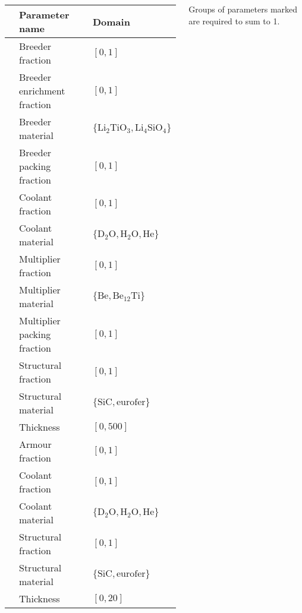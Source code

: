\begin{frame}
\begin{columns}[T]
		\vspace{5pt}
		{\fontsize{7.5pt}{7.5pt}\selectfont
		\setlength\tabcolsep{3pt}
		\begin{tabular}{l|ll}
		\toprule
		{} & Parameter name & Domain\\
		\midrule
		\parbox[t]{2mm}{\hspace{-2pt}}
		   & Breeder fraction\textsuperscript{\textdagger} & $[0,1]$\\
		   & Breeder  enrichment fraction & $[0,1]$\\
		   & Breeder material & $\{\text{Li}_2\text{TiO}_3, \text{Li}_4\text{SiO}_4\}$\\
		   & Breeder packing fraction & $[0,1]$\\
		   & Coolant fraction\textsuperscript{\textdagger} & $[0,1]$\\
		   & Coolant material & $\{\text{D}_2\text{O}, \text{H}_2\text{O}, \text{He}\}$\\
		   & Multiplier fraction\textsuperscript{\textdagger} & $[0,1]$\\
		   & Multiplier material & $\{\text{Be}, \text{Be}_{12}\text{Ti}\}$\\
		   & Multiplier packing fraction & $[0,1]$\\
		   & Structural fraction\textsuperscript{\textdagger} & $[0,1]$\\
		   & Structural material & $\{\text{SiC}, \text{eurofer}\}$\\
		   & Thickness & $[0,500]$\\
		\midrule
		\parbox[t]{2mm}{\hspace{-2pt}}
		   & Armour fraction\textsuperscript{\textdaggerdbl} & $[0,1]$\\
		   & Coolant fraction\textsuperscript{\textdaggerdbl} & $[0,1]$\\
		   & Coolant material & $\{\text{D}_2\text{O}, \text{H}_2\text{O}, \text{He}\}$\\
		   & Structural fraction\textsuperscript{\textdaggerdbl} & $[0,1]$\\
		   & Structural material & $\{\text{SiC}, \text{eurofer}\}$\\
		   & Thickness & $[0,20]$\\
		\bottomrule
		\end{tabular}
		}

		{\tiny
		Groups of parameters marked\textsuperscript{\textdagger\textdaggerdbl}
		are required to sum to 1.
		}

    \end{columns}
\end{frame}

